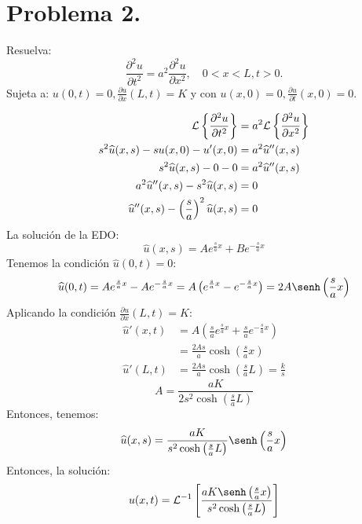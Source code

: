 
\section{Problema 2.} Resuelva: 
$$\frac{\partial ^2 u}{\partial t^2}= a^2\frac{\partial ^2 u}{\partial x^2}, \quad 0<x<L, t>0.$$
Sujeta a: $u(0,t)=0, \frac{\partial u}{\partial x}(L,t)=K$ y con $u(x,0)=0, \frac{\partial u}{\partial t}(x,0)=0.$

\begin{solution}
\begin{align*}
	\mathcal{L}\left\{\frac{\partial ^2 u}{\partial t^2}\right\} &= a^2 \mathcal{L}\left\{\frac{\partial ^2 u}{\partial x^2}\right\}\\
	s^2\widehat{u}(x,s)-su(x,0)-u'(x,0) &= a^2\widehat{u}''(x,s)\\
	s^2\widehat{u}(x,s)-0- 0&= a^2\widehat{u}''(x,s)\\
	a^2\widehat{u}''(x,s)-s^2\widehat{u}(x,s)&= 0\\
	\widehat{u}''(x,s)-\left(\frac{s}{a}\right)^2\widehat{u}(x,s)&= 0
\end{align*}
La solución de la EDO:
$$\widehat{u}(x,s) = Ae^{\frac{s}{a}x}+Be^{-\frac{s}{a}x}$$
Tenemos la condición $\widehat{u}(0,t)=0$:
$$\widehat{u}(0,t)=Ae^{\frac{s}{a}x}-Ae^{-\frac{s}{a}x}=A\left(e^{\frac{s}{a}x}-e^{-\frac{s}{a}x}\right)=2A\senh\left(\frac{s}{a}x\right)$$
Aplicando la condición $\frac{\partial u}{\partial x }(L,t)=K$: 
\begin{align*}
	\widehat{u}'(x,t) &= A\left(\frac{s}{a}e^{\frac{s}{a}x}+\frac{s}{a}e^{-\frac{s}{a}x}\right)\\
									&= \frac{2As}{a}\cosh\left(\frac{s}{a}x\right)\\
	\widehat{u}'(L,t) &= \frac{2As}{a}\cosh\left(\frac{s}{a}L\right) =\frac{k}{s}
\end{align*}
$$A=\frac{aK}{2s^2\cosh\left(\frac{s}{a}L\right)}$$
Entonces, tenemos: 
$$\widehat{u}(x,s)=\frac{aK}{s^2\cosh\left(\frac{s}{a}L\right)}\senh\left(\frac{s}{a}x\right)$$
Entonces, la solución: 
$$u(x,t)=\iLaplace{\frac{aK\senh\left(\frac{s}{a}x\right)}{s^2\cosh\left(\frac{s}{a}L\right)}}$$

\end{solution}